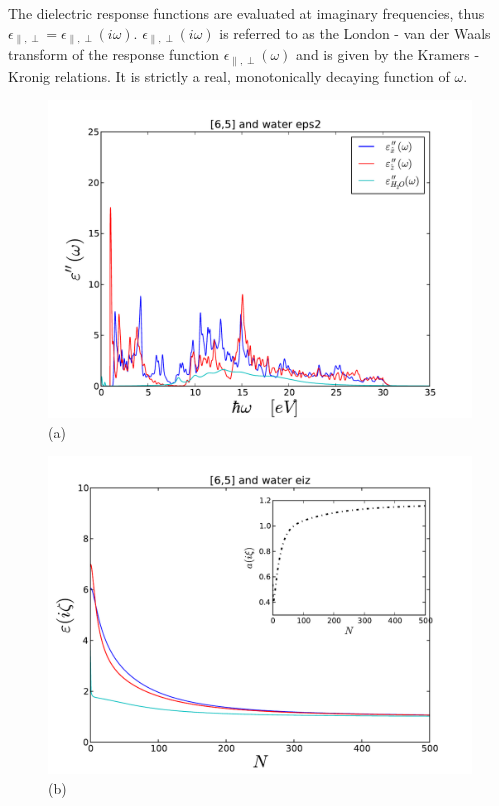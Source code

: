 \documentclass[onecolumn,letterpaper,amsmath,amssymb,floatfix,aps,superscriptaddress]{revtex4}
\begin{document}
The dielectric response functions are evaluated at imaginary frequencies, 
thus $\epsilon_{\parallel,\perp} = \epsilon_{\parallel,\perp}(i \omega)$. $\epsilon_{\parallel,\perp}(i \omega)$ is referred to as the London - van der Waals 
transform of the response function $\epsilon_{\parallel,\perp}(\omega)$ and is given by the Kramers - Kronig relations. It is strictly a real, monotonically 
decaying function of $\omega$. 
\begin{figure}[t!]
\begin{center}
\begin{minipage}[b]{0.40\textwidth}
\begin{center}
\includegraphics[width=1.2\textwidth]{prop_plots/65w65_eps2.pdf} (a)
\end{center}
\end{minipage}
\hskip 43pt
\begin{minipage}[b]{0.40\textwidth}
\begin{center}
\includegraphics[width=1.2\textwidth]{prop_plots/65w65_eiz.pdf} (b)

\end{center}
\end{minipage}
\end{center}
\end{figure}
\end{document}
